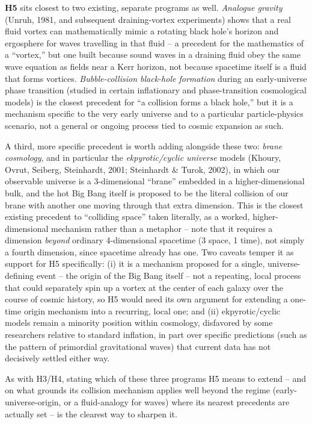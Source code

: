 \documentclass[12pt, a4paper]{article}
\begin{document}
\textbf{H5} sits closest to two existing, separate programs as well.
\emph{Analogue gravity} (Unruh, 1981, and subsequent draining-vortex
experiments) shows that a real fluid vortex can mathematically mimic
a rotating black hole's horizon and ergosphere for waves travelling
in that fluid -- a precedent for the mathematics of a ``vortex,'' but
one built because sound waves in a draining fluid obey the same wave
equation as fields near a Kerr horizon, not because spacetime itself
is a fluid that forms vortices. \emph{Bubble-collision black-hole
formation} during an early-universe phase transition (studied in
certain inflationary and phase-transition cosmological models) is the
closest precedent for ``a collision forms a black hole,'' but it is a
mechanism specific to the very early universe and to a particular
particle-physics scenario, not a general or ongoing process tied to
cosmic expansion as such.

A third, more specific precedent is worth adding alongside these two:
\emph{brane cosmology}, and in particular the \emph{ekpyrotic/cyclic
universe} models (Khoury, Ovrut, Seiberg, Steinhardt, 2001; Steinhardt
\& Turok, 2002), in which our observable universe is a
3-dimensional ``brane'' embedded in a higher-dimensional bulk, and the
hot Big Bang itself is proposed to be the literal collision of our
brane with another one moving through that extra dimension. This is
the closest existing precedent to ``colliding space'' taken
literally, as a worked, higher-dimensional mechanism rather than a
metaphor -- note that it requires a dimension \emph{beyond} ordinary
4-dimensional spacetime (3 space, 1 time), not simply a fourth
dimension, since spacetime already has one. Two caveats temper it as
support for H5 specifically: (i) it is a mechanism proposed for a
single, universe-defining event -- the origin of the Big Bang itself
-- not a repeating, local process that could separately spin up a
vortex at the center of each galaxy over the course of cosmic history,
so H5 would need its own argument for extending a one-time origin
mechanism into a recurring, local one; and (ii) ekpyrotic/cyclic
models remain a minority position within cosmology, disfavored by
some researchers relative to standard inflation, in part over specific
predictions (such as the pattern of primordial gravitational waves)
that current data has not decisively settled either way.

As with H3/H4, stating which of these three
programs H5 means to extend -- and on what grounds its collision
mechanism applies well beyond the regime (early-universe-origin, or
a fluid-analogy for waves) where its nearest precedents are actually
set -- is the clearest way to sharpen it.
\end{document}
